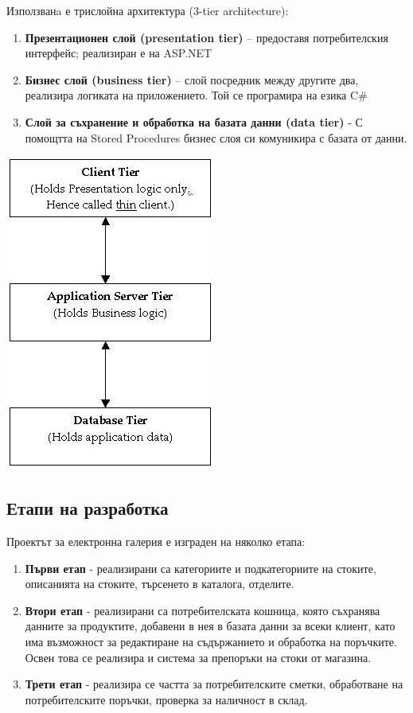 \documentclass[a4paper,14pt]{article}
\begin{document}
Използванa е трислойна архитектура (3-tier architecture):
\begin{enumerate}
\item
\textbf{Презентационен слой (presentation tier)} – предоставя потребителския интерфейс; реализиран е на ASP.NET
\item
\textbf{Бизнес слой (business tier)} – слой посредник между другите два, реализира логиката на приложението. Той се програмира на езика C\#
\item
\textbf{Слой за съхранение и обработка на базата данни (data tier)} -  С помощтта на Stored Procedures бизнес слоя си комуникира с базата от данни.
\end{enumerate}
\includegraphics{21}



\subsection{Етапи на разработка}

Проектът за електронна галерия е изграден на няколко етапа:
\begin{enumerate}
\item
\textbf{Първи етап} - реализирани са категориите и подкатегориите на стоките, описанията на стоките, търсенето в каталога, отделите.
\item
\textbf{Втори етап} - реализирани са потребителската кошница, която съхранява данните за продуктите, добавени в нея в базата данни за всеки клиент, като има възможност за редактиране на съдържанието и обработка на поръчките. Освен това се реализира и система за препоръки на стоки от магазина.

\item
\textbf{Трети етап} - реализира се частта за потребителските сметки, обработване на потребителските поръчки, проверка за наличност в склад.
\end{enumerate}
\end{document}
